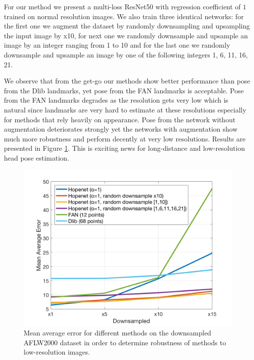 \documentclass[10pt,twocolumn,letterpaper]{article}
\begin{document}
For our method we present a multi-loss ResNet50 with regression coefficient of $1$ trained on normal resolution images. We also train three identical networks: for the first one we augment the dataset by randomly downsampling and upsampling the input image by x10, for next one we randomly downsample and upsample an image by an integer ranging from 1 to 10 and for the last one we randomly downsample and upsample an image by one of the following integers 1, 6, 11, 16, 21.

We observe that from the get-go our methods show better performance than pose from the Dlib landmarks, yet pose from the FAN landmarks is acceptable. Pose from the FAN landmarks degrades as the resolution gets very low which is natural since landmarks are very hard to estimate at these resolutions especially for methods that rely heavily on appearance. Pose from the network without augmentation deteriorates strongly yet the networks with augmentation show much more robustness and perform decently at very low resolutions. Results are presented in Figure \ref{low_resolution}. This is exciting news for long-distance and low-resolution head pose estimation.
\begin{figure}[t]
\begin{center}
   \includegraphics[width=1\linewidth]{low_resolution.png}
\end{center}
   \caption{Mean average error for different methods on the downsampled AFLW2000 dataset in order to determine robustness of methods to low-resolution images.}
   \label{low_resolution}
\end{figure}
\end{document}
